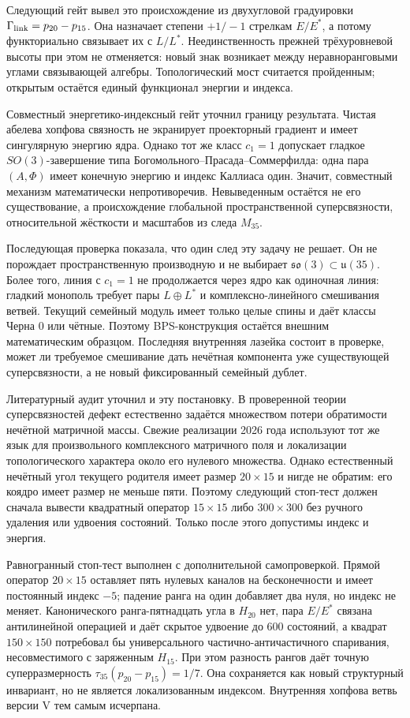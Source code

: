 Следующий гейт вывел это происхождение из двухугловой градуировки
$\Gamma_{\rm link}=p_{20}-p_{15}$. Она назначает степени $+1/-1$ стрелкам
$E/E^*$, а потому функториально связывает их с $L/L^*$. Неединственность
прежней трёхуровневой высоты при этом не отменяется: новый знак возникает
между неравноранговыми углами связывающей алгебры. Топологический мост
считается пройденным; открытым остаётся единый функционал энергии и
индекса.

Совместный энергетико-индексный гейт уточнил границу результата. Чистая
абелева хопфова связность не экранирует проекторный градиент и имеет
сингулярную энергию ядра. Однако тот же класс $c_1=1$ допускает гладкое
$SO(3)$-завершение типа Богомольного--Прасада--Соммерфилда: одна пара
$(A,\Phi)$ имеет конечную энергию и индекс Каллиаса один. Значит,
совместный механизм математически непротиворечив. Невыведенным остаётся
не его существование, а происхождение глобальной пространственной
суперсвязности, относительной жёсткости и масштабов из следа $M_{35}$.

Последующая проверка показала, что один след эту задачу не решает. Он не
порождает пространственную производную и не выбирает
$\mathfrak{so}(3)\subset\mathfrak u(35)$. Более того, линия с $c_1=1$ не
продолжается через ядро как одиночная линия: гладкий монополь требует
пары $L\oplus L^*$ и комплексно-линейного смешивания ветвей. Текущий
семейный модуль имеет только целые спины и даёт классы Черна $0$ или
чётные. Поэтому BPS-конструкция остаётся внешним математическим образцом.
Последняя внутренняя лазейка состоит в проверке, может ли требуемое
смешивание дать нечётная компонента уже существующей суперсвязности, а не
новый фиксированный семейный дублет.

Литературный аудит уточнил и эту постановку. В проверенной теории
суперсвязностей дефект естественно задаётся множеством потери обратимости
нечётной матричной массы. Свежие реализации 2026 года используют тот же
язык для произвольного комплексного матричного поля и локализации
топологического характера около его нулевого множества. Однако
естественный нечётный угол текущего родителя имеет размер $20\times15$ и
нигде не обратим: его коядро имеет размер не меньше пяти. Поэтому следующий
стоп-тест должен сначала вывести квадратный оператор $15\times15$ либо
$300\times300$ без ручного удаления или удвоения состояний. Только после
этого допустимы индекс и энергия.

Равногранный стоп-тест выполнен с дополнительной самопроверкой. Прямой
оператор $20\times15$ оставляет пять нулевых каналов на бесконечности и
имеет постоянный индекс $-5$; падение ранга на один добавляет два нуля,
но индекс не меняет. Канонического ранга-пятнадцать угла в $H_{20}$ нет,
пара $E/E^*$ связана антилинейной операцией и даёт скрытое удвоение до
600 состояний, а квадрат $150\times150$ потребовал бы универсального
частично-античастичного спаривания, несовместимого с заряженным $H_{15}$.
При этом разность рангов даёт точную суперразмерность
$\tau_{35}(p_{20}-p_{15})=1/7$. Она сохраняется как новый структурный
инвариант, но не является локализованным индексом. Внутренняя хопфова
ветвь версии V тем самым исчерпана.

